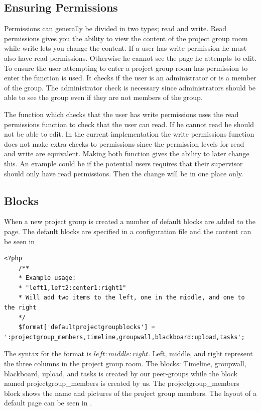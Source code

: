 \FloatBarrier
\subsection{Ensuring Permissions}
\label{sec:projectgrouproommanagerights}
Permissions can generally be divided in two types; read and write. 
Read permissions gives you the ability to view the content of the project group room while write lets you change the content. 
If a user has write permission he must also have read permissions. 
Otherwise he cannot see the page he attempts to edit. 
To ensure the user attempting to enter a project group room has permission to enter the function  is used. 
It checks if the user is an administrator or is a member of the group. 
The administrator check is necessary since administrators should be able to see the group even if they are not members of the group. 

The function   which checks that the user has write permissions uses the read permissions function to check that the user can read.
If he cannot read he should not be able to edit. 
In the current implementation the write permissions function does not make extra checks to permissions since the permission levels for read and write are equivalent.
Making both function gives the ability to later change this.
An example could be if the potential users requires that their supervisor should only have read permissions. 
Then the change will be in one place only. 

\subsection{Blocks}
\label{sec:implprojectgroupblocks}
When a new project group is created a number of default blocks are added to the page. 
The default blocks are specified in a configuration file and the content can be seen in 


\begin{lstlisting}[style=phpCode, caption=\myCaption{The default block configuration}, label=moodledaultblock]
<?php
	/**
	* Example usage:
	* "left1,left2:center1:right1"
	* Will add two items to the left, one in the middle, and one to the right
	*/
	$format['defaultprojectgroupblocks'] = ':projectgroup_members,timeline,groupwall,blackboard:upload,tasks';
\end{lstlisting}
The syntax for the format is $left:middle:right$. 
Left, middle, and right represent the three columns in the project group room. 
The blocks: Timeline, groupwall, blackboard, upload, and tasks is created by our peer-groups while the block named projectgroup\_members is created by us. 
The projectgroup\_members block shows the name and pictures of the project group members. 
The layout of a default page can be seen in .

